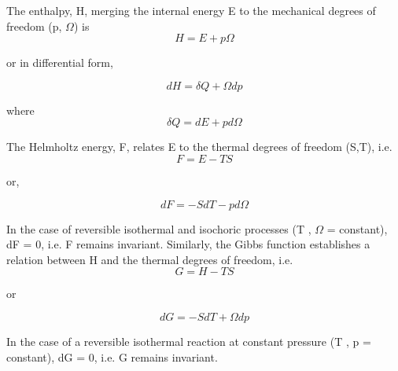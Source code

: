 \documentclass[12pt]{article}
\newcommand*{\1}{\hspace{1pt}}
\begin{document}
        The enthalpy, H, merging the internal energy E to the mechanical degrees of freedom
        (p, $\Omega$) is\\
                        
                    \begin{equation}
                        H = E + p\Omega
                    \end{equation}

        or in differential form,
                    
                    \begin{equation}
                        dH = \delta Q + \Omega dp
                    \end{equation}

        where       \begin{equation*}
                        \delta Q = dE + pd \Omega
                    \end{equation*}

        The Helmholtz energy, F, relates E to the thermal degrees of freedom (S,T), i.e.\\

                    \begin{equation}
                        F = E - TS
                    \end{equation}

        or,

                    \begin{equation}
                        dF = -SdT - pd \Omega
                    \end{equation}

        In the case of reversible isothermal and isochoric processes (T , $\Omega$ = constant),
        dF = 0, i.e.
        F remains invariant.
            Similarly, the Gibbs function establishes a relation between H and the thermal degrees
        of freedom, i.e.\\

                    \begin{equation}
                    G = H - TS
                    \end{equation}

    or

                    \begin{equation}
                    dG = -S dT + \Omega dp
                    \end{equation}

        In the case of a reversible isothermal reaction at constant pressure (T , p = constant),
        dG = 0, i.e. G remains invariant.\\
\end{document}
